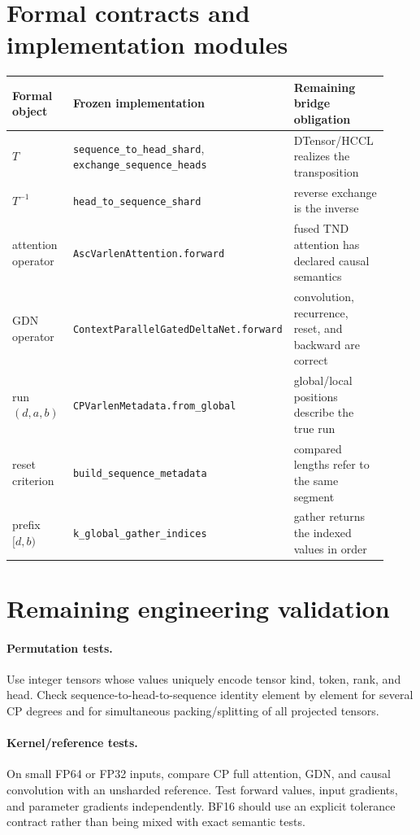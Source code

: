 \documentclass[11pt,a4paper]{article}
\begin{document}
\section{Formal contracts and implementation modules}

\begin{center}
\begin{tabular}{p{0.22\linewidth}p{0.36\linewidth}p{0.34\linewidth}}
\toprule
Formal object & Frozen implementation & Remaining bridge obligation \\
\midrule
$T$ & \texttt{sequence\_to\_head\_shard}, \texttt{exchange\_sequence\_heads} & DTensor/HCCL realizes the transposition \\
$T^{-1}$ & \texttt{head\_to\_sequence\_shard} & reverse exchange is the inverse \\
attention operator & \texttt{AscVarlenAttention.forward} & fused TND attention has declared causal semantics \\
GDN operator & \texttt{ContextParallelGatedDeltaNet.forward} & convolution, recurrence, reset, and backward are correct \\
run $(d,a,b)$ & \texttt{CPVarlenMetadata.from\_global} & global/local positions describe the true run \\
reset criterion & \texttt{build\_sequence\_metadata} & compared lengths refer to the same segment \\
prefix $[d,b)$ & \texttt{k\_global\_gather\_indices} & gather returns the indexed values in order \\
\bottomrule
\end{tabular}
\end{center}

\section{Remaining engineering validation}

\paragraph{Permutation tests.}
Use integer tensors whose values uniquely encode tensor kind, token, rank, and head. Check sequence-to-head-to-sequence identity element by element for several CP degrees and for simultaneous packing/splitting of all projected tensors.

\paragraph{Kernel/reference tests.}
On small FP64 or FP32 inputs, compare CP full attention, GDN, and causal convolution with an unsharded reference. Test forward values, input gradients, and parameter gradients independently. BF16 should use an explicit tolerance contract rather than being mixed with exact semantic tests.
\end{document}
